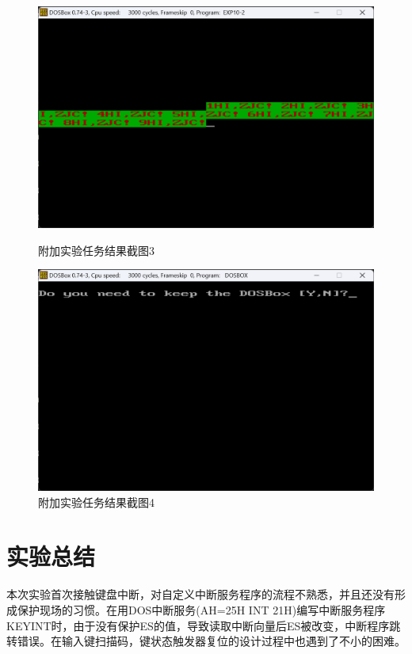 \documentclass[12pt, a4paper, oneside]{ctexart}
\begin{document}
\begin{figure}[H]
    \centering
    \begin{minipage}{0.45\textwidth}
    \centering
    \includegraphics[scale=0.48]{pic/exp10-7.png}
    \caption{附加实验任务结果截图3}
    \label{附加实验任务结果截图3}
    \end{minipage}
    \hspace{0.05\textwidth}
    \begin{minipage}{0.45\textwidth}
    \centering
    \includegraphics[scale=0.48]{pic/exp10-8.png}
    \caption{附加实验任务结果截图4}
    \label{附加实验任务结果截图4}
    \end{minipage}
\end{figure}
\section{实验总结}
本次实验首次接触键盘中断，对自定义中断服务程序的流程不熟悉，并且还没有形成保护现场的习惯。在用DOS中断服务(AH=25H INT 21H)编写中断服务程序KEYINT时，由于没有保护ES的值，导致读取中断向量后ES被改变，中断程序跳转错误。在输入键扫描码，键状态触发器复位的设计过程中也遇到了不小的困难。
\end{document}
